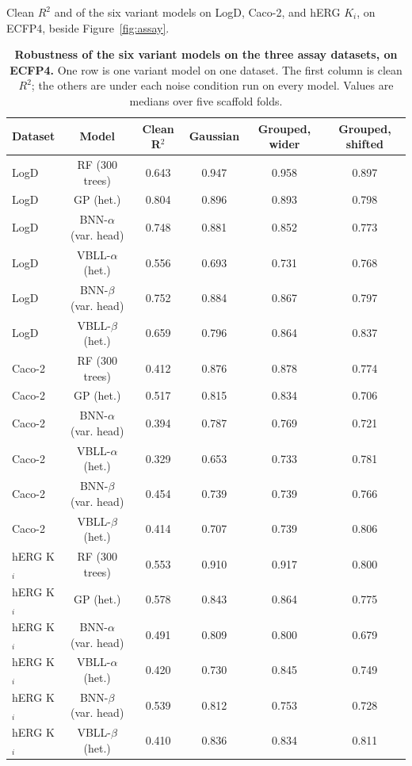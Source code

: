 \clearpage
{}
\label{app:noise:sec:variant_models_assay}
Clean $R^2$ and \aucnorm{} of the six variant models on LogD, Caco-2, and hERG $K_i$, on ECFP4, beside Figure~\ref{fig:assay}.
\begin{table}[H]
\centering
\caption{\textbf{Robustness of the six variant models on the three assay datasets, on ECFP4.}
One row is one variant model on one dataset. The first column is clean $R^2$; the others are \aucnorm{} under each noise condition run on every model. Values are medians over five scaffold folds.}
\label{app:noise:variant_models_assay}
\footnotesize
\begin{tabular}{lccccc}
\toprule
Dataset & Model & Clean R$^2$ & Gaussian & Grouped, wider & Grouped, shifted \\
\midrule
LogD & RF (300 trees) & 0.643 & 0.947 & 0.958 & 0.897 \\
LogD & GP (het.) & 0.804 & 0.896 & 0.893 & 0.798 \\
LogD & BNN-$\alpha$ (var. head) & 0.748 & 0.881 & 0.852 & 0.773 \\
LogD & VBLL-$\alpha$ (het.) & 0.556 & 0.693 & 0.731 & 0.768 \\
LogD & BNN-$\beta$ (var. head) & 0.752 & 0.884 & 0.867 & 0.797 \\
LogD & VBLL-$\beta$ (het.) & 0.659 & 0.796 & 0.864 & 0.837 \\
Caco-2 & RF (300 trees) & 0.412 & 0.876 & 0.878 & 0.774 \\
Caco-2 & GP (het.) & 0.517 & 0.815 & 0.834 & 0.706 \\
Caco-2 & BNN-$\alpha$ (var. head) & 0.394 & 0.787 & 0.769 & 0.721 \\
Caco-2 & VBLL-$\alpha$ (het.) & 0.329 & 0.653 & 0.733 & 0.781 \\
Caco-2 & BNN-$\beta$ (var. head) & 0.454 & 0.739 & 0.739 & 0.766 \\
Caco-2 & VBLL-$\beta$ (het.) & 0.414 & 0.707 & 0.739 & 0.806 \\
hERG K$_i$ & RF (300 trees) & 0.553 & 0.910 & 0.917 & 0.800 \\
hERG K$_i$ & GP (het.) & 0.578 & 0.843 & 0.864 & 0.775 \\
hERG K$_i$ & BNN-$\alpha$ (var. head) & 0.491 & 0.809 & 0.800 & 0.679 \\
hERG K$_i$ & VBLL-$\alpha$ (het.) & 0.420 & 0.730 & 0.845 & 0.749 \\
hERG K$_i$ & BNN-$\beta$ (var. head) & 0.539 & 0.812 & 0.753 & 0.728 \\
hERG K$_i$ & VBLL-$\beta$ (het.) & 0.410 & 0.836 & 0.834 & 0.811 \\
\bottomrule
\end{tabular}
\end{table}

